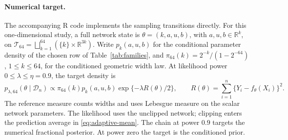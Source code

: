 \documentclass[11pt,a4paper]{article}
\theoremstyle{remark}
\newcommand{\Dcal}{\mathcal D}
\begin{document}
\paragraph{Numerical target.}
The accompanying R code implements the sampling transitions directly.
For this one-dimensional study, a full network state is
$\theta=(k,a,u,b)$, with $a,u,b\in\mathbb R^k$, on
$\mathcal T_{64}=\bigsqcup_{k=1}^{64}
(\{k\}\times\mathbb R^{3k})$.
Write $p_k(a,u,b)$ for the conditional parameter density of the
chosen row of Table~\ref{tab:families}, and
$\pi_{64}(k)=2^{-k}/(1-2^{-64})$, $1\leq k\leq64$, for the
conditioned geometric width law. At likelihood power
$0\leq\lambda\leq\eta=0.9$, the target density is
\begin{equation}\label{eq:simulation-target}
p_{\lambda,64}(\theta\mid\Dcal_n)\propto
\pi_{64}(k)p_k(a,u,b)
\exp\{-\lambda R(\theta)/2\},\qquad
R(\theta)=\sum_{i=1}^n\{Y_i-f_\theta(X_i)\}^2.
\end{equation}
The reference measure counts widths and uses Lebesgue measure on
the scalar network parameters. The likelihood uses the unclipped network;
clipping enters the prediction average in \eqref{eq:adaptive-mean}.
The chain at power $0.9$ targets the numerical fractional posterior.
At power zero the target is the conditioned prior.

\endgroup
\end{document}
